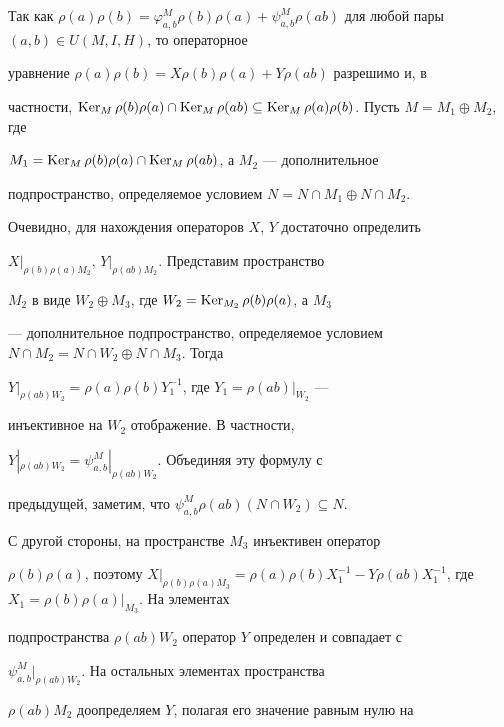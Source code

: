 \begin{pf} 


Так как $\rho(a)\rho(b)=\varphi^M_{a,b}\rho(b)\rho(a)+ 


\psi^M_{a,b}\rho(ab)$ для любой пары $(a,b)\in U(M,I,H)$, то операторное 


уравнение $\rho(a)\rho(b)=X\rho(b)\rho(a)+ Y\rho(ab)$ разрешимо и, в 


частности, $\Ker_M\rho(b)\rho(a)\cap \Ker_M\rho(ab)\subseteq 


\Ker_M\rho(a)\rho(b)$. Пусть $M=M_1\oplus M_2$, где 


$M_1=\operatorname{Ker}_M\rho(b)\rho(a)\cap \operatorname{Ker}_M\rho(ab)$, а $M_2$ --- дополнительное 


подпространство, определяемое условием $N{=}N{\cap}M_1{\oplus} N{\cap} M_2$. 




Очевидно, для нахождения операторов $X$, $Y$ достаточно определить 


$X|_{\rho(b)\rho(a)M_2}$, $Y|_{\rho(ab)M_2}$. Представим пространство 


$M_2$ в виде $W_2\oplus M_3$, где $W_2=\operatorname{Ker}_{M_2}\rho(b)\rho(a)$, а $M_3$ 


--- дополнительное подпространство, определяемое условием $N\cap 


M_2=N\cap W_2\oplus N\cap M_3$. Тогда 


$Y|_{\rho(ab)W_2}=\rho(a)\rho(b)Y^{-1}_1$, где $Y_1=\rho(ab)|_{W_2}$ --- 


инъективное на $W_2$ отображение. В частности, 


$Y|_{\rho(ab)W_2}{=}\psi^M_{a,b}|_{\rho(ab)W_2}$. Объединяя эту формулу с 


предыдущей, заметим, что $\psi^M_{a,b}\rho(ab)(N\cap W_2){\subseteq} N$.  


 


С другой стороны, на пространстве $M_3$ инъективен оператор 


$\rho(b)\rho(a)$, поэтому $X|_{\rho(b)\rho(a)M_3}=\rho(a)\rho(b)X^{-1}_1- 


Y\rho(ab)X^{-1}_1$, где $X_1=\rho(b)\rho(a)|_{M_3}$. На элементах 


подпространства $\rho(ab)W_2$ оператор $Y$ определен и совпадает с 


$\psi^M_{a,b}|_{\rho(ab)W_2}$. На остальных элементах пространства 


$\rho(ab)M_2$ доопределяем $Y$, полагая его значение равным нулю на 



\end{pf}
